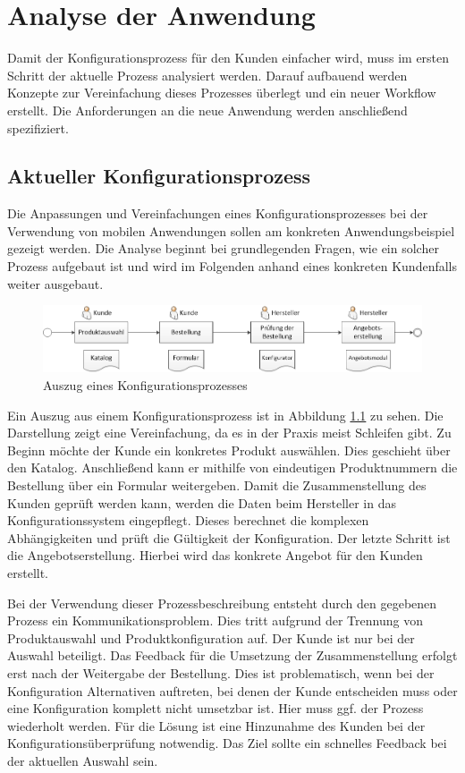 \chapter{Analyse der Anwendung}\label{chapter_3}
Damit der Konfigurationsprozess für den Kunden einfacher wird, muss im ersten Schritt der aktuelle Prozess analysiert werden. Darauf aufbauend werden Konzepte zur Vereinfachung dieses Prozesses überlegt und ein neuer Workflow erstellt. Die Anforderungen an die neue Anwendung werden anschließend spezifiziert.

\section{Aktueller Konfigurationsprozess}
Die Anpassungen und Vereinfachungen eines Konfigurationsprozesses bei der Verwendung von mobilen Anwendungen sollen am konkreten Anwendungsbeispiel gezeigt werden. Die Analyse beginnt bei grundlegenden Fragen, wie ein solcher Prozess aufgebaut ist und wird im Folgenden anhand eines konkreten Kundenfalls weiter ausgebaut.

\begin{figure}
\label{oldWorkflow}
\centering
\includegraphics[width=\hsize]{images/konfigurationsprozess_alt}
\caption{Auszug eines Konfigurationsprozesses}
\end{figure}
Ein Auszug aus einem Konfigurationsprozess ist in Abbildung  \ref{oldWorkflow} zu sehen. Die Darstellung zeigt eine Vereinfachung, da es in der Praxis meist Schleifen gibt. Zu Beginn möchte der Kunde ein konkretes Produkt auswählen. Dies geschieht über den Katalog.  Anschließend kann er mithilfe von eindeutigen Produktnummern die Bestellung über ein Formular weitergeben. Damit die Zusammenstellung des Kunden geprüft werden kann, werden die Daten beim Hersteller in das Konfigurationssystem eingepflegt. Dieses berechnet die komplexen Abhängigkeiten und prüft die Gültigkeit der Konfiguration. Der letzte Schritt ist die Angebotserstellung. Hierbei wird das konkrete Angebot für den Kunden erstellt.
\par

Bei der Verwendung dieser Prozessbeschreibung entsteht durch den gegebenen Prozess ein Kommunikationsproblem. Dies tritt aufgrund der Trennung von Produktauswahl und Produktkonfiguration auf. Der Kunde ist nur bei der Auswahl beteiligt. Das Feedback für die Umsetzung der Zusammenstellung erfolgt erst nach der Weitergabe der Bestellung. Dies ist problematisch, wenn bei der Konfiguration Alternativen auftreten, bei denen der Kunde entscheiden muss oder eine Konfiguration komplett nicht umsetzbar ist. Hier muss ggf. der Prozess wiederholt werden. Für die Lösung ist eine Hinzunahme des Kunden bei der Konfigurationsüberprüfung notwendig. Das Ziel sollte ein schnelles Feedback bei der aktuellen Auswahl sein. \par 

